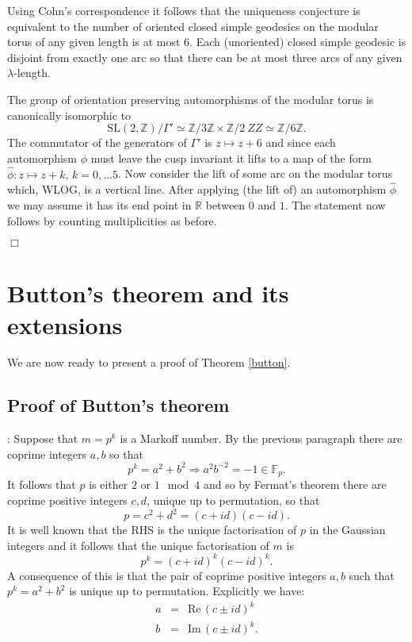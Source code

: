 \documentclass[12pt,a4paper]{amsart}
\def\ZZ{\mathbb{Z}}
\def\RR{\mathbb{R}}
\def\fp{\mathbb{F}_p}
\def\sl2{\mathrm{SL}(2, \ZZ)}
\begin{document}
Using Cohn's correspondence it follows that the uniqueness conjecture is equivalent
to the number of oriented closed simple geodesics on the modular torus of any
given length is at most 6. Each (unoriented) closed simple geodesic is disjoint
from exactly one arc so that there can be at most three arcs of any given
$\lambda$-length.

The group of orientation preserving  automorphisms of the modular torus 
is canonically isomorphic to 
$$\sl2 / \Gamma' \simeq \ZZ/3\ZZ \times \ZZ/2\ ZZ \simeq \ZZ/6\ZZ .$$
The commutator of the generators of $ \Gamma'$  is $z \mapsto z + 6$
and since each automorphism $\phi$ must leave the cusp invariant it lifts to
a map of the form $\hat{\phi} : z \mapsto z + k,\, k= 0,\dots 5$.
Now consider the lift of some arc on the modular torus 
which, WLOG, is a vertical line. 
After applying (the lift of)  an automorphism $\hat{\phi}$ 
we may assume it has its end point in $\RR$ between $0$ and $1$.
The statement now follows by counting multiplicities as before.

\hfill $\Box$


\section{Button's theorem and its extensions}

We are now ready to present a proof of Theorem \ref{button}.

 
\subsection{Proof of Button's theorem}

 \proof: Suppose that $m=p^k$ is a Markoff number. By the previous paragraph there are coprime integers $a,b$ so that 
$$p^k = a^2 + b^2 \Rightarrow a^2b^{-2} = -1 \in \fp.$$
It follows that $p$ is either $2$ or $1 \mod 4$ and 
so by Fermat's theorem  there are coprime positive integers $c,d$,
 unique up to permutation,
so that  $$p = c^2 + d^2 = (c + id)(c - id).$$
It is well known that the RHS is the unique factorisation of $p$ in the Gaussian integers
and it follows that the unique factorisation of $m$ is
$$p^k = (c + id)^k(c - id)^k.$$
A consequence of this is that the pair of coprime positive integers $a,b$ such that $p^k = a^2 + b^2$
is unique up to permutation. Explicitly we have:
\begin{eqnarray}
a &=& \mathrm{Re}\, (c\pm id)^k \\
b &=& \mathrm{Im}\, (c\pm id)^k.
\end{eqnarray}
\end{document}
